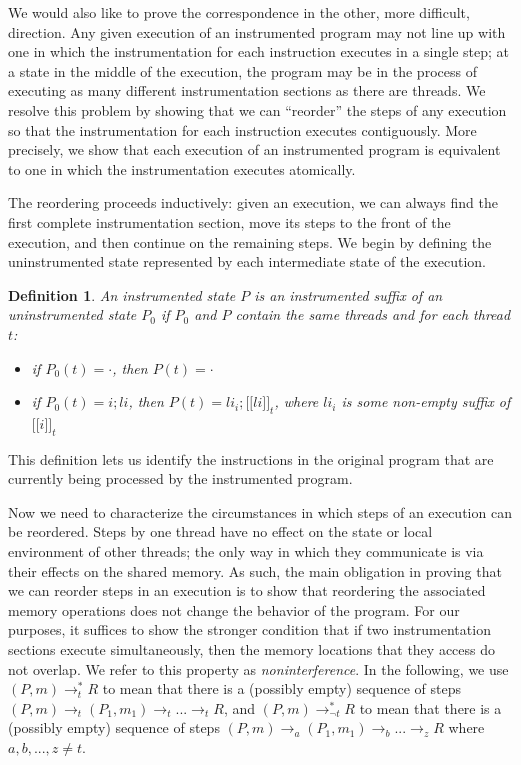 \documentclass[preprint, 9pt]{sigplanconf}
\newcommand{\meanl}{\ensuremath{[ \! [}}
\newcommand{\meanr}{\ensuremath{] \! ]}}
\newcommand{\means}[1]{\ensuremath{\meanl #1 \meanr}}
\newcommand{\instr}[2]{\ensuremath{\means{#2}_{#1}}}
\newcommand{\cfg}[2]{\ensuremath{(#1, #2)}}
\newcommand{\execstart}[4]{\ensuremath{\cfg{#1}{#2} \rightarrow^{*}_{#3} #4}}
\newcommand{\execstarm}[4]{\ensuremath{\cfg{#1}{#2} \rightarrow^{*}_{\neg #3} #4}}
\newtheorem{definition}{Definition}
\begin{document}
We would also like to prove the correspondence in the other, more difficult, direction. Any given execution of an instrumented program may not line up with one in which the instrumentation for each instruction executes in a single step; at a state in the middle of the execution, the program may be in the process of executing as many different instrumentation sections as there are threads. We resolve this problem by showing that we can ``reorder'' the steps of any execution so that the instrumentation for each instruction executes contiguously. More precisely, we show that each execution of an instrumented program is equivalent to one in which the instrumentation executes atomically.

The reordering proceeds inductively: given an execution, we can always find the first complete instrumentation section, move its steps to the front of the execution, and then continue on the remaining steps. We begin by defining the uninstrumented state represented by each intermediate state of the execution.
\begin{definition}An instrumented state $P$ is an \emph{instrumented suffix} of an uninstrumented state $P_0$ if $P_0$ and $P$ contain the same threads and for each thread $t$:
\begin{itemize}
\item if $P_0(t) = \cdot$, then $P(t) = \cdot$
\item if $P_0(t) = i; \mathit{li}$, then $P(t) = \mathit{li}_i; \instr{t}{\mathit{li}}$, where $\mathit{li}_i$ is some non-empty suffix of $\instr{t}{i}$
\end{itemize}
\end{definition}
\noindent This definition lets us identify the instructions in the original program that are currently being processed by the instrumented program.

Now we need to characterize the circumstances in which steps of an execution can be reordered. Steps by one thread have no effect on the state or local environment of other threads; the only way in which they communicate is via their effects on the shared memory. As such, the main obligation in proving that we can reorder steps in an execution is to show that reordering the associated memory operations does not change the behavior of the program. For our purposes, it suffices to show the stronger condition that if two instrumentation sections execute simultaneously, then the memory locations that they access do not overlap. We refer to this property as \emph{noninterference}. In the following, we use $\execstart{P}{m}{t}{R}$ to mean that there is a (possibly empty) sequence of steps $(P, m) \rightarrow_t (P_1, m_1) \rightarrow_t ... \rightarrow_t R$, and $\execstarm{P}{m}{t}{R}$ to mean that there is a (possibly empty) sequence of steps $(P, m) \rightarrow_a (P_1, m_1) \rightarrow_b ... \rightarrow_z R$ 
where $a, b, ..., z \neq t$. 
\end{document}
